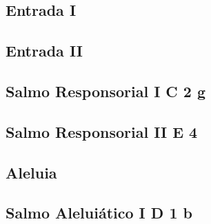 \def\Prefix{communia/commune-martyrum/}

\subsection{Entrada I}\label{subsection:communia/commune-martyrum/introitus-1}

\AllowPageFlush

\subsection{Entrada II}\label{subsection:communia/commune-martyrum/introitus-2}

\AllowPageFlush

\subsection[Salmo Responsorial I]{Salmo Responsorial I \textmd{C 2 g}}\label{subsection:communia/commune-martyrum/psalmus-responsorius-1}

\subsection[Salmo Responsorial II]{Salmo Responsorial II \textmd{E 4}}\label{subsection:communia/commune-martyrum/psalmus-responsorius-2}

\AllowPageFlush

\subsection{Aleluia}\label{subsection:communia/commune-martyrum/alleluia}

\AllowPageFlush

\subsection[Salmo Aleluiático I]{Salmo Aleluiático I \textmd{D 1 b}}\label{subsection:communia/commune-martyrum/psalmus-alleluiaticus-1}

\AllowPageFlush

